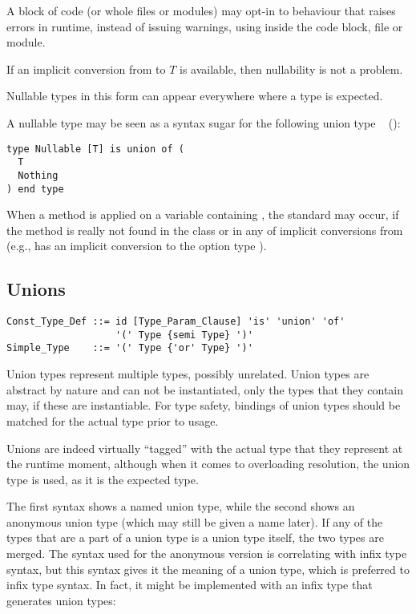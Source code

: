 A block of code (or whole files or modules) may opt-in to behaviour that raises errors in runtime, instead of issuing warnings, using  inside the code block, file or module. 

If an implicit conversion from  to $T$ is available, then nullability is not a problem. 

Nullable types in this form can appear everywhere where a type is expected. 

A nullable type may be seen as a syntax sugar for the following union type ~ ():
\begin{lstlisting}
type Nullable [T] is union of (
  T
  Nothing
) end type
\end{lstlisting}

When a method is applied on a variable containing , the standard  may occur, if the method is really not found in the class  or in any of implicit conversions from  (e.g.,  has an implicit conversion to the option type ). 





\subsection{Unions}
\label{sec:unions}

\syntax\begin{lstlisting}
Const_Type_Def ::= id [Type_Param_Clause] 'is' 'union' 'of'
                   '(' Type {semi Type} ')'
Simple_Type    ::= '(' Type {'or' Type} ')'
\end{lstlisting}

Union types represent multiple types, possibly unrelated. Union types are abstract by nature and can not be instantiated, only the types that they contain may, if these are instantiable. For type safety, bindings of union types should be matched for the actual type prior to usage. 

Unions are indeed virtually ``tagged'' with the actual type that they represent at the runtime moment, although when it comes to overloading resolution, the union type is used, as it is the expected type. 

The first syntax shows a named union type, while the second shows an anonymous union type (which may still be given a name later). If any of the types that are a part of a union type is a union type itself, the two types are merged. The syntax used for the anonymous version is correlating with infix type syntax, but this syntax gives it the meaning of a union type, which is preferred to infix type syntax. In fact, it might be implemented with an infix type that generates union types:

